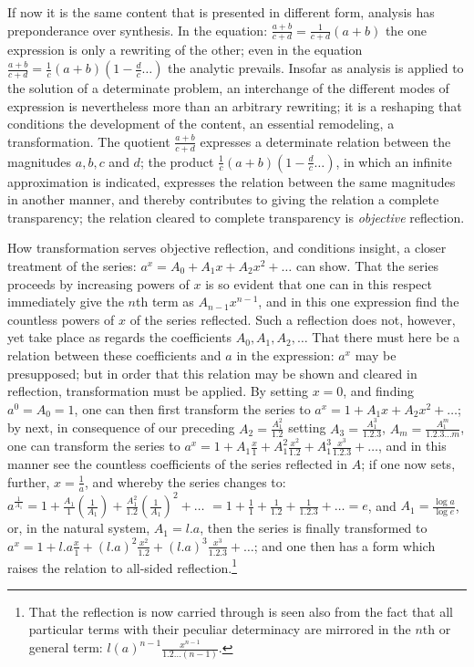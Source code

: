 \documentclass[12pt,a4paper,openany]{book}
\newcommand{\opage}[1]{\marginnote{\footnotesize\textit{[#1]}}}
\begin{document}
If now it is the same content that is presented in different form, analysis has preponderance over synthesis. In the equation: $\frac{a+b}{c+d}=\frac{1}{c+d}(a+b)$ the one expression is only a rewriting of the other; even in the equation $\frac{a+b}{c+d}=\frac{1}{c}(a+b)\left(1-\frac{d}{c}\ldots\right)$ the analytic prevails. Insofar as analysis is applied to the solution of a determinate problem, an interchange of the different modes of expression is nevertheless more than an
\setcounter{footnote}{0}%
\opage{45}arbitrary rewriting; it is a reshaping that conditions the development of the content, an essential remodeling, a transformation. The quotient $\frac{a+b}{c+d}$ expresses a determinate relation between the magnitudes $a, b, c$ and $d$; the product $\frac{1}{c}(a+b)\left(1-\frac{d}{c}\ldots\right)$, in which an infinite approximation is indicated, expresses the relation between the same magnitudes in another manner, and thereby contributes to giving the relation a complete transparency; the relation cleared to complete transparency is \emph{objective} reflection.

How transformation serves objective reflection, and conditions insight, a closer treatment of the series: $a^{x}=A_{0}+A_{1}x+A_{2}x^{2}+\ldots$ can show. That the series proceeds by increasing powers of $x$ is so evident that one can in this respect immediately give the $n$th term as $A_{n-1}x^{n-1}$, and in this one expression find the countless powers of $x$ of the series reflected. Such a reflection does not, however, yet take place as regards the coefficients $A_{0}, A_{1}, A_{2}, \ldots$ That there must here be a relation between these coefficients and $a$ in the expression: $a^{x}$ may be presupposed; but in order that this relation may be shown and cleared in reflection, transformation must be applied. By setting $x=0$, and finding $a^{0}=A_{0}=1$, one can then first transform the series to $a^{x}=1+A_{1}x+A_{2}x^{2}+\ldots$; by next, in consequence of our preceding $A_{2}=\frac{A_{1}^{2}}{1.2}$ setting $A_{3}=\frac{A_{1}^{3}}{1.2.3}$, $A_{m}=\frac{A_{1}^{m}}{1.2.3\ldots m}$, one can transform the series to $a^{x}=1+A_{1}\frac{x}{1}+A_{1}^{2}\frac{x^{2}}{1.2}+A_{1}^{3}\frac{x^{3}}{1.2.3}+\ldots$, and in this manner see the countless coefficients of the series reflected in $A$; if one now sets, further, $x=\frac{1}{a}$, and whereby %
the series changes to: $a^{\frac{1}{A_{1}}}=1+\frac{A_{1}}{1}\left(\frac{1}{A_{1}}\right)+\frac{A_{1}^{2}}{1.2}\left(\frac{1}{A_{1}}\right)^{2}+\ldots$
\setcounter{footnote}{0}%
\opage{46}$=1+\frac{1}{1}+\frac{1}{1.2}+\frac{1}{1.2.3}+\ldots=e$, and $A_{1}=\frac{\log a}{\log e}$, or, in the natural system, $A_{1}=l.a$, then the series is finally transformed to $a^{x}=1+l.a\frac{x}{1}+(l.a)^{2}\frac{x^{2}}{1.2}+(l.a)^{3}\frac{x^{3}}{1.2.3}+\ldots$; and one then has a form which raises the relation to all-sided reflection.\footnote[1]{That the reflection is now carried through is seen also from the fact that all particular terms with their peculiar determinacy are mirrored in the $n$th or general term: $l(a)^{n-1}\frac{x^{n-1}}{1.2\ldots(n-1)}$.}
\end{document}
